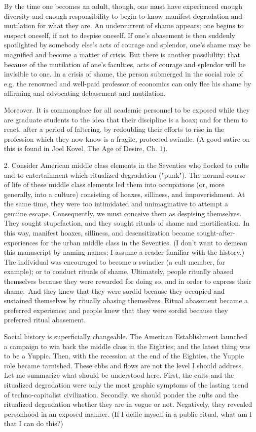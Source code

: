 By the time one becomes an adult, though, one must have experienced enough diversity and enough responsibility to begin to know manifest degradation and mutilation for what they are. An undercurrent of shame appears; one begins to suspect oneself, if not to despise oneself. If one's abasement is then suddenly spotlighted by somebody else's acts of courage and splendor, one's shame may be magnified and become a matter of crisis. But there is another possibility: that because of the mutilation of one's faculties, acts of courage and splendor will be invisible to one. In a crisis of shame, the person submerged in the social role of e.g. the renowned and well-paid professor of economics can only flee his shame by affirming and advocating debasement and mutilation.

Moreover. It is commonplace for all academic personnel to be exposed while they are graduate students to the idea that their discipline is a hoax; and for them to react, after a period of faltering, by redoubling their efforts to rise in the profession which they now know is a fragile, protected swindle. (A good satire on this is found in Joel Kovel, The Age of Desire, Ch. 1).

2. Consider American middle class elements in the Seventies who flocked to cults and to entertainment which ritualized degradation ("punk"). The normal course of life of these middle class elements led them into occupations (or, more generally, into a culture) consisting of hoaxes, silliness, and impoverishment. At the same time, they were too intimidated and unimaginative to attempt a genuine escape. Consequently, we must conceive them as despising themselves. They sought stupefaction, and they sought rituals of shame and mortification. In this way, manifest hoaxes, silliness, and desensitization became sought-after-experiences for the urban middle class in the Seventies. (I don't want to demean this manuscript by naming names; I assume a reader familiar with the history.) The individual was encouraged to become a swindler (a cult member, for example); or to conduct rituals of shame. Ultimately, people ritually abased themselves because they were rewarded for doing so, and in order to express their shame.--And they knew that they were sordid because they occupied and sustained themselves by ritually abasing themselves. Ritual abasement became a preferred experience; and people knew that they were sordid because they preferred ritual abasement.

Social history is superficially changeable. The American Establishment launched a campaign to win back the middle class in the Eighties; and the latest thing was to be a Yuppie. Then, with the recession at the end of the Eighties, the Yuppie role became tarnished. These ebbs and flows are not the level I should address. Let me summarize what should be understood here. First, the cults and the ritualized degradation were only the most graphic symptoms of the lasting trend of techno-capitalist civilization. Secondly, we should ponder the cults and the ritualized degradation whether they are in vogue or not. Negatively, they revealed personhood in an exposed manner. (If I defile myself in a public ritual, what am I that I can do this?)

